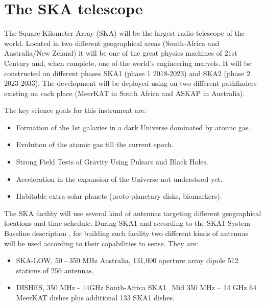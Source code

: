 \documentclass[review]{elsarticle}
\begin{document}

\section{The SKA telescope}

The Square Kilometer Array (SKA) will be the largest radio-telescope of the world. Located in two different geographical areas (South-Africa and Australia/New Zeland) it will be one of the great physics machines of 21st Century and, when complete, one of the world’s engineering marvels. It will be constructed on different phases SKA1 (phase 1 2018-2023) and SKA2 (phase 2 2023-2033). The development will be deployed using on two different pathfinders existing on each place (MeerKAT in South Africa and ASKAP in Australia). 

The key science goals for this instrument are:

\begin{itemize}
	\item {Formation of the 1st galaxies in a dark Universe dominated by atomic gas.}
	\item {Evolution of the atomic gas till the current epoch.}
	\item {Strong Field Tests of Gravity Using Pulsars and Black Holes.}
	\item {Acceleration in the expansion of the Universe not understood yet.}
	\item {Habitable extra-solar planets (proto-planetary disks, biomarkers).}
\end{itemize}

The SKA facility will use several kind of antennas targeting different geographical locations and time schedule. During SKA1 and according to the SKA1 System Baseline description \cite{ska:baseline_description_v2}, for building such facility two different kinds of antennas will be used according to their capabilities to sense. They are: 

\begin{itemize}
	\item {SKA-LOW, 50 - 350 MHz Australia, 131,000 aperture array dipole 512 stations of 256 antennas.}
	\item {DISHES, 350 MHz - 14GHz South-Africa SKA1\_Mid 350 MHz – 14 GHz 64 MeerKAT dishes plus additional 133 SKA1 dishes.}
\end{itemize}
\end{document}
